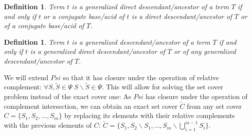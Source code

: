 \documentclass[10pt]{bmc_article}
\newenvironment{bmcformat}{\baselineskip20pt\sloppy\setboolean{publ}{false}}{\baselineskip20pt\sloppy}
\begin{document}
\begin{bmcformat}
\newtheorem{dirgent}[def]{Definition}
\begin{dirgent}
Term $t$ is a generalized direct descendant/ancestor of a term $T$ if and only if $t$ or a conjugate base/acid of $t$ is a direct descendant/ancestor of $T$ or of a conjugate base/acid of $T$.
\end{dirgent} 

\newtheorem{gent}[def]{Definition}
\begin{gent}
Term $t$ is a generalized descendant/ancestor of a term $T$ if and only if $t$ is a generalized direct descendant/ancestor of $T$ or of any generalized descendant/ancestor of $T$.
\end{gent} 



We will extend $Psi$ so that it has closure under the operation of relative complement: $\forall S,\tilde{S} \in \Psi \; S\backslash\tilde{S} \in \Psi$. This will allow for solving the set cover problem instead of the exact cover one:  As $Psi$ has closure under the operation of complement intersection, we can obtain an exact set cover $\tilde{C}$ from any set cover $C = \{S_1, S_2, \ldots, S_m\}$ by replacing its elements with their relative complements with the previous elements of $C$: $\tilde{C} = \{S_1, S_2 \backslash S_1, \ldots, S_m \backslash \bigcup^{m - 1}_{i = 1}{S_i}\}$.


\end{bmcformat}
\end{document}
